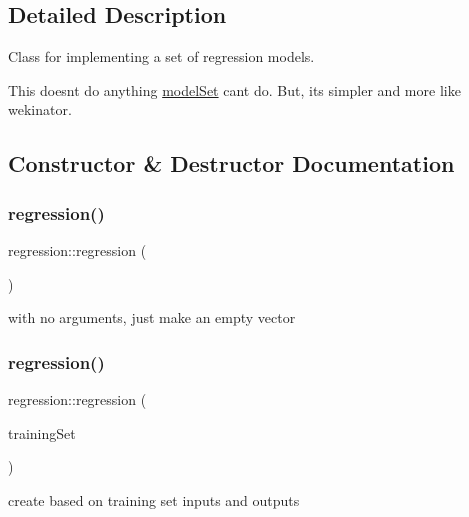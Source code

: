 \subsection{Detailed Description}
Class for implementing a set of regression models.

This doesn\textquotesingle{}t do anything \hyperlink{classmodel_set}{model\+Set} can\textquotesingle{}t do. But, it\textquotesingle{}s simpler and more like wekinator. 

\subsection{Constructor \& Destructor Documentation}
\mbox{\label{classregression_a40993153659b1f637cf4d596df6e97ab}} 
\subsubsection{\texorpdfstring{regression()}{regression()}\hspace{0.1cm}{\footnotesize\ttfamily [1/3]}}
{\footnotesize\ttfamily regression\+::regression (\begin{DoxyParamCaption}{ }\end{DoxyParamCaption})}

with no arguments, just make an empty vector \mbox{\label{classregression_ad03f74e09d96f315de3933628e8f4138}} 
\subsubsection{\texorpdfstring{regression()}{regression()}\hspace{0.1cm}{\footnotesize\ttfamily [2/3]}}
{\footnotesize\ttfamily regression\+::regression (\begin{DoxyParamCaption}\item[{std\+::vector$<$ \hyperlink{structtraining_example}{training\+Example} $>$}]{training\+Set }\end{DoxyParamCaption})}

create based on training set inputs and outputs \mbox{\label{classregression_a9d38dcda0e5c99caf0faf85f98a5ebb3}} 
